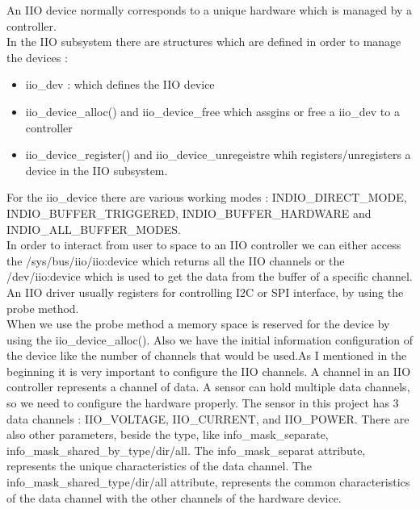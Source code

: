 \documentclass[l2pt, letterpaper]{article}
\begin{document}
An IIO device normally corresponds to a unique hardware which is managed by a
controller. \\

In the IIO subsystem there are structures which are defined in order to manage
the devices : \\

\begin{itemize}
    \item iio\_dev : which defines the IIO device
    \item iio\_device\_alloc() and iio\_device\_free which assgins or free a iio\_dev to a
controller
    \item iio\_device\_register() and iio\_device\_unregeistre whih registers/unregisters
a device in the IIO subsystem.
\end{itemize}

For the iio\_device there are various working modes : INDIO\_DIRECT\_MODE,
INDIO\_BUFFER\_TRIGGERED, INDIO\_BUFFER\_HARDWARE and INDIO\_ALL\_BUFFER\_MODES. \\

In order to interact from user to space to an IIO controller we can either access
the /sys/bus/iio/iio:device which returns all the IIO channels or the /dev/iio:device
which is used to get the data from the buffer of a specific channel.\\

An IIO driver usually registers for controlling I2C or SPI interface, by using the
probe method. \\

When we use the probe method a memory space is reserved for the device by
using the iio\_device\_alloc(). Also we have the initial information configuration of
the device like the number of channels that would be used.As I mentioned in the beginning it is very important to configure the IIO channels. A channel in an IIO controller represents a channel of data. A sensor
can hold multiple data channels, so we need to configure the hardware properly.
The sensor in this project has 3 data channels : IIO\_VOLTAGE, IIO\_CURRENT, and
IIO\_POWER. There are also other parameters, beside the type, like
info\_mask\_separate, info\_mask\_shared\_by\_type/dir/all. The info\_mask\_separat
attribute, represents the unique characteristics of the data channel. The
info\_mask\_shared\_type/dir/all attribute, represents the common characteristics
of the data channel with the other channels of the hardware device. \\
\end{document}
